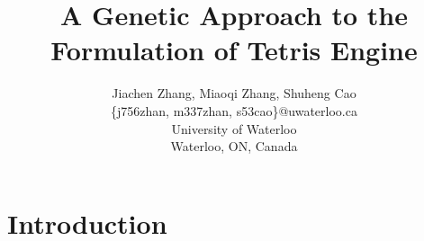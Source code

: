 \documentclass[letterpaper]{article} %
\begin{document}
%
\title{A Genetic Approach to the Formulation of Tetris Engine}
\author{Jiachen Zhang, Miaoqi Zhang, Shuheng Cao\\
\{j756zhan, m337zhan, s53cao\}@uwaterloo.ca\\
University of Waterloo\\
Waterloo, ON, Canada\\
}
\maketitle
\newcommand\bi[1]{{\textcolor{black}{#1}}}
\newcommand\blue[1]{\textcolor{blue}{\textbf{#1}}}



\section{Introduction} 
\end{document}
